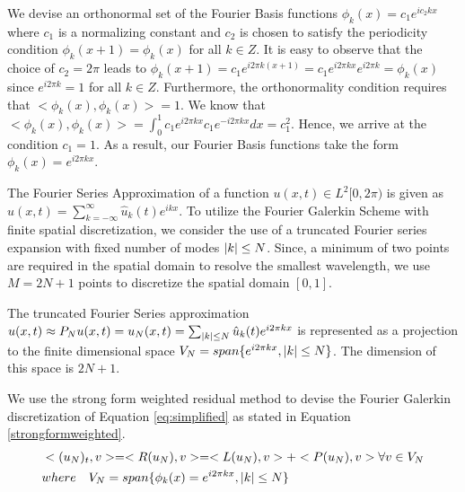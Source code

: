 \documentclass[12pt]{article}
\DeclarePairedDelimiter\abs{\lvert}{\rvert}
\begin{document}
We devise an orthonormal set of the Fourier Basis functions $\phi_k(x) = c_1 e^{ic_2 kx}$ where $c_1$ is a normalizing constant and $c_2$ is chosen to satisfy the periodicity condition $\phi_k(x + 1) = \phi_k(x)$ for all $k \in Z$. It is easy to observe that the choice of $c_2 = 2 \pi$ leads to $\phi_k(x + 1) = c_1 e^{i 2 \pi k (x + 1)} = c_1 e^{ i 2\pi k x } e^{i 2 \pi k} = \phi_k(x)$ since $e^{i 2 \pi k} = 1$ for all $k \in Z$. Furthermore, the orthonormality condition requires that $<\phi_k(x), \phi_k(x)> = 1$. We know that $<\phi_k(x), \phi_k(x)> = \int_{0}^{1} c_1 e^{i2 \pi kx} c_1 e^{-i2 \pi kx}dx = c_1^2$. Hence, we arrive at the condition $c_1 = 1$. As a result, our Fourier Basis functions take the form $ \phi_k(x) =  e^{i2 \pi kx}$.  

The Fourier Series Approximation of a function $u(x, t) \in L^2[0, 2 \pi )$ is given as $u(x, t) = \sum_{k = -\infty}^{\infty} \hat{u}_k(t) e^{ikx}$. To utilize the Fourier Galerkin Scheme with finite spatial discretization, we consider the use of a truncated Fourier series expansion with fixed number of modes $\abs{k} \leq N$. Since, a minimum of two points are required in the spatial domain to resolve the smallest wavelength, we use $M = 2N + 1$ points to discretize the spatial domain $[0, 1]$.

The truncated Fourier Series approximation $u(x, t) \approx P_N u(x, t) = u_N(x, t) = \sum_{\abs{k} \leq N} \hat{u}_k(t) e^{i2 \pi kx}$ is represented as a projection to the finite dimensional space $V_N = span\{ e^{i 2 \pi kx}, \abs{k} \leq N \}$. The dimension of this space is $2N + 1$.

We use the strong form weighted residual method to devise the Fourier Galerkin discretization of Equation \ref{eq:simplified} as stated in Equation \ref{strongformweighted}.
\begin{equation}
    \begin{aligned}
        & <(u_N)_t, v> = <R(u_N), v> = <L(u_N), v> + <P(u_N), v> \forall v \in V_N \\
        & where \quad V_N = span\{ \phi_k(x) = e^{i2 \pi kx}, \abs{k} \leq N \}
    \end{aligned}
    \label{strongformweighted}
\end{equation}
\end{document}
